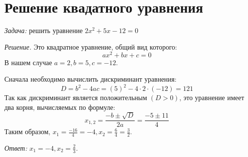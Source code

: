 \documentclass[12pt]{article}
\begin{document}
\section{Решение квадатного уравнения}
\textit{Задача:} решить уравнение $2x^2 + 5x - 12 = 0$

\textit{Решение.} Это квадратное уравнение, общий вид которого:
\[ax^2 + bx + c = 0\]
В нашем случае $a = 2, b = 5, c = -12.$

Сначала необходимо вычислить дискриминант уравнения:
\[D = b^2 - 4ac = (5)^2 - 4 \cdot 2 \cdot (-12) = 121\]
Так как дискриминант является положительным $(D > 0)$, это уравнение\newline
имеет два корня, вычисляемых по формуле:
\[x_{1,2} = \frac{-b \pm \sqrt{D}}{2a} = \frac{-5 \pm 11}{4}\]
Таким образом, $x_1 = \frac{-16}{4} = -4, x_2 = \frac{6}{4} = \frac{3}{2}.$

\textit{Ответ:} $x_1 = -4, x_2 = \frac{2}{3}.$
\end{document}
